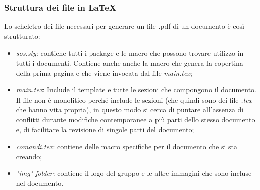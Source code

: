 	\subsubsection{Struttura dei file in \LaTeX}
	Lo scheletro dei file necessari per generare un file .pdf di un documento è così strutturato:
	\begin{itemize}
		\item \emph{sos.sty}: contiene tutti i package e le macro che possono trovare utilizzo in tutti i documenti. Contiene  anche anche la macro che genera la copertina della prima pagina e che viene invocata dal file \emph{main.tex};
		\item \emph{main.tex}: Include il template e tutte le sezioni che compongono il documento. Il file non è monolitico perché include le sezioni (che quindi sono dei file \emph{.tex} che hanno vita propria), in questo modo si cerca di puntare all'assenza di conflitti durante modifiche contemporanee a più parti dello stesso documento e, di facilitare la revisione di singole parti del documento;
		\item \emph{comandi.tex}: contiene delle macro specifiche per il documento che si sta creando;
		\item \emph{"img" folder}: contiene il logo del gruppo e le altre immagini che sono incluse nel documento.
	\end{itemize}
